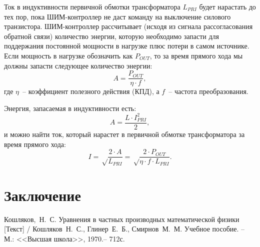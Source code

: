 Ток в индуктивности первичной обмотки трансформатора \( L_{PRI} \) будет нарастать до тех пор, пока ШИМ-контроллер не даст команду на выключение силового транзистора.  ШИМ-контроллер рассчитывает (исходя из сигнала рассогласования обратной связи) количество энергии, которую необходимо запасти для поддержания постоянной мощности в нагрузке плюс потери в самом источнике. Если мощность в нагрузке обозначить как \( P_{OUT} \), то за время прямого хода мы должны запасти следующее количество энергии:
\begin{equation}
    A = \frac{P_{OUT}}{\eta\cdot f},
\end{equation}
где \( \eta \)~-- коэффициент полезного действия (КПД), а \( f \)~-- частота преобразования.

Энергия, запасаемая в индуктивности есть:
\begin{equation}
    A = \frac{L\cdot I_{PRI}^2}{2},
\end{equation}
и можно найти ток, который нарастет в первичной обмотке трансформатора за время прямого хода:
\begin{equation}
    I = \sqrt\frac{2\cdot A}{L_{PRI}} = \sqrt\frac{2\cdot P_{OUT}}{\eta\cdot f\cdot L_{PRI}}.
\end{equation}

\section{Заключение}
\newpage

\begin{thebibliography}{9}
    Кошляков,~Н.~С. Уравнения в частных производных
    математической физики [Текст] / Кошляков~Н.~С., Глинер~Е.~Б., Смирнов~М.~М.
    Учебное пособие. -- М.: <<Высшая школа>>, 1970.-- 712с.
\end{thebibliography}
